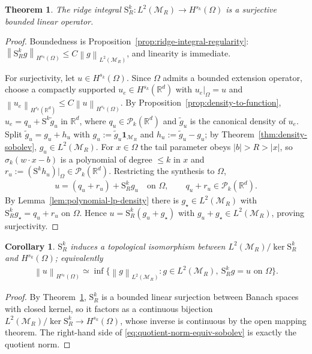 \documentclass[12pt]{article}
\numberwithin{equation}{section}
\newtheorem{theorem}{Theorem}[section]
\newtheorem{corollary}{Corollary}[section]
\numberwithin{figure}{section}
\numberwithin{equation}{section}
\newcommand{\R}{\mathbb{R}}
\newcommand{\MR}{\mathcal M_R}
\newcommand{\norm}[1]{\left\|#1\right\|}
\newcommand{\abs}[1]{\left|#1\right|}
\begin{document}
\begin{theorem}\label{thm:bounded-bias-decomposition}
The ridge integral $\mathrm{S}^k_R:L^2(\MR)\to H^{s_k}(\Omega)$ is a surjective
bounded linear operator.
\end{theorem}

\begin{proof}
Boundedness is Proposition~\ref{prop:ridge-integral-regularity}:
$\norm{\mathrm{S}^k_R g}_{H^{s_k}(\Omega)}\le C\norm{g}_{L^2(\MR)}$, and linearity
is immediate.

For surjectivity, let $u\in H^{s_k}(\Omega)$. Since $\Omega$ admits a bounded
extension operator, choose a compactly supported $u_e\in H^{s_k}(\R^d)$ with
$u_e|_\Omega=u$ and $\norm{u_e}_{H^{s_k}(\R^d)}\le C\norm{u}_{H^{s_k}(\Omega)}$.
By Proposition~\ref{prop:density-to-function},
$u_e=q_u+\mathrm{S}^k\widetilde g_u$ in $\R^d$, where $q_u\in\mathcal P_k(\R^d)$ and
$\widetilde g_u$ is the canonical density of $u_e$. Split
$\widetilde g_u=g_u+h_u$ with $g_u:=\widetilde g_u\mathbf 1_{\MR}$ and
$h_u:=\widetilde g_u-g_u$; by Theorem~\ref{thm:density-sobolev},
$g_u\in L^2(\MR)$. For $x\in\Omega$ the tail parameter obeys $\abs b>R>\abs x$,
so $\sigma_k(w\cdot x-b)$ is a polynomial of degree $\le k$ in $x$ and
$r_u:=(\mathrm{S}^k h_u)|_\Omega\in\mathcal P_k(\R^d)$. Restricting the synthesis to
$\Omega$,
\begin{align*}
    u=(q_u+r_u)+\mathrm{S}^k_R g_u\quad\text{on }\Omega,
    \qquad q_u+r_u\in\mathcal P_k(\R^d).
\end{align*}
By Lemma~\ref{lem:polynomial-lp-density} there is $g_\star\in L^2(\MR)$ with
$\mathrm{S}^k_R g_\star=q_u+r_u$ on $\Omega$. Hence
$u=\mathrm{S}^k_R(g_u+g_\star)$ with $g_u+g_\star\in L^2(\MR)$, proving
surjectivity.
\end{proof}

\begin{corollary}\label{cor:quotient-norm-equiv-sobolev}
$\mathrm{S}^k_R$ induces a topological isomorphism between $L^2(\MR)/\ker\mathrm{S}^k_R$
and $H^{s_k}(\Omega)$; equivalently
\begin{align}\label{eq:quotient-norm-equiv-sobolev}
    \norm{u}_{H^{s_k}(\Omega)}
    \simeq\inf\big\{\norm{g}_{L^2(\MR)}:g\in L^2(\MR),\ \mathrm{S}^k_R g=u\text{ on }\Omega\big\}.
\end{align}
\end{corollary}

\begin{proof}
By Theorem~\ref{thm:bounded-bias-decomposition}, $\mathrm{S}^k_R$ is a bounded
linear surjection between Banach spaces with closed kernel, so it factors as a
continuous bijection $L^2(\MR)/\ker\mathrm{S}^k_R\to H^{s_k}(\Omega)$, whose
inverse is continuous by the open mapping theorem. The right-hand side of
\eqref{eq:quotient-norm-equiv-sobolev} is exactly the quotient norm.
\end{proof}
\end{document}
